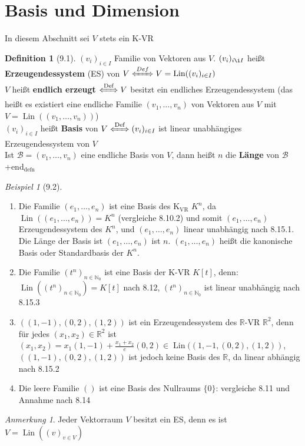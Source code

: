 \documentclass[a4paper]{scrartcl}
\DeclareMathOperator{\Lin}{Lin}
\theoremstyle{definition}
\newtheorem{defn}{Definition}
\theoremstyle{plain}
\theoremstyle{plain}
\theoremstyle{remark}
\theoremstyle{remark}
\newtheorem{note}{Anmerkung}
\theoremstyle{remark}
\theoremstyle{remark}
\theoremstyle{remark}
\newtheorem{ex}{Beispiel}
\begin{document}
\section{Basis und Dimension}
\label{sec-6}
In diesem Abschnitt sei $V$ stets ein K-VR
\begin{defn}[9.1]
$(v_i)_{i\in I}$ Familie von Vektoren aus $V$. $(v_i)_{i\i I}$ heißt \textbf{Erzeugendessystem} (ES) von $V \xLeftrightarrow{Def} V = \Lin((v_i)_{i\in I})$ \\
  $V$ heißt \textbf{endlich erzeugt} $\xLeftrightarrow{\text{Def}} V$ besitzt ein endliches Erzeugendessystem (das heißt es existiert eine endliche Familie $(v_1, \ldots, v_n)$ von Vektoren aus $V$ mit $V = \Lin((v_1, \ldots, v_n))$) \\
  $(v_i)_{i\in I}$ heißt \textbf{Basis} von $V \xLeftrightarrow{\text{Def}} (v_i)_{i\in I}$ ist linear unabhängiges Erzeugendessystem von $V$ \\
  Ist $\mathcal{B} = (v_1, \ldots, v_n)$ eine endliche Basis von $V$, dann heißt $n$ die \textbf{Länge} von $\mathcal{B}$
+end$_{\text{defn}}$
\begin{ex}[9.2]
\begin{enumerate}
\item Die Familie $(e_1, \ldots, e_n)$ ist eine Basis des K$_{\text{VR}}$ $K^n$, da $\Lin((e_1, \ldots, e_n)) = K^n$ (vergleiche 8.10.2) und somit $(e_1,\ldots, e_n)$ Erzeugendessystem des $K^n$, und $(e_1, \ldots, e_n)$ linear unabhängig nach 8.15.1.
Die Länge der Basis ist $(e_1, \ldots, e_n)$ ist $n$. $(e_1, \ldots, e_n)$ heißt die kanonische Basis oder Standardbasis der $K^n$.
\item Die Familie $(t^n)_{n\in\mathbb{N}_0}$ ist eine Basis der K-VR $K[t]$, denn: $\Lin((t^n)_{n\in\mathbb{N}_0}) = K[t]$ nach 8.12, $(t^n)_{n\in\mathbb{N}_0}$ ist linear unabhängig nach 8.15.3
\item $((1, -1), (0,2), (1,2))$ ist ein Erzeugendessystem des $\mathbb{R}$-VR $\mathbb{R}^2$, denn für jedes $(x_1, x_2) \in \mathbb{R}^2$ ist $(x_1, x_2) = x_1(1, -1) + \frac{x_1 + x_2}{e}(0,2)\in \Lin((1,-1, (0,2), (1,2))$,
$((1, -1), (0,2), (1,2))$ ist jedoch keine Basis des $\mathbb{R}$, da linear abhängig nach 8.15.2
\item Die leere Familie $()$ ist eine Basis des Nullraums $\{0\}$: vergleiche 8.11 und Annahme nach 8.14
\end{enumerate}
\end{ex}
\begin{note}
Jeder Vektorraum $V$ besitzt ein ES, denn es ist $V = \Lin((v)_{v \in V})$ \\

\end{note}
\end{defn}
\end{document}
